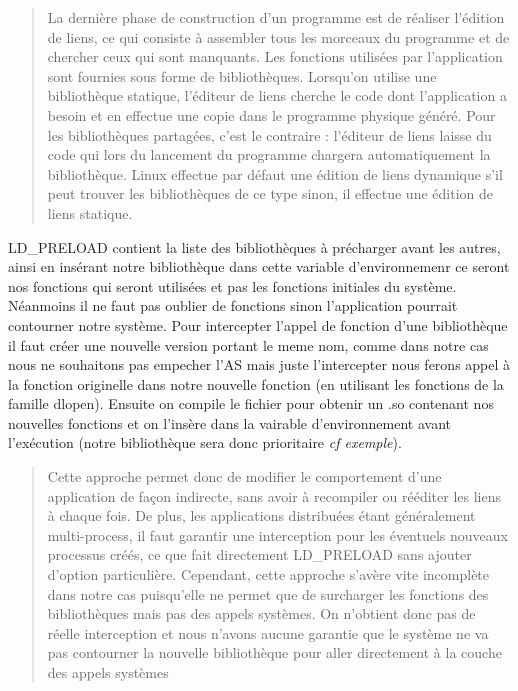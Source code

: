 \documentclass{article}
\begin{document}
\begin{quotation} 
{\color{green} La dernière phase de construction d’un programme est de
  réaliser l’édition de liens, ce qui consiste à assembler tous les
  morceaux du programme et de chercher ceux qui sont manquants.  Les
  fonctions utilisées par l’application sont fournies sous forme de
  bibliothèques. Lorsqu’on utilise une bibliothèque statique,
  l’éditeur de liens cherche le code dont l’application a besoin et en
  effectue une copie dans le programme physique généré. Pour les
  bibliothèques partagées, c’est le contraire : l’éditeur de liens
  laisse du code qui lors du lancement du programme chargera
  automatiquement la bibliothèque. Linux effectue par défaut une
  édition de liens dynamique s’il peut trouver les bibliothèques de ce
  type sinon, il effectue une édition de liens statique.  }
\end{quotation}

LD\_PRELOAD contient la liste des bibliothèques à précharger avant les
autres, ainsi en insérant notre bibliothèque dans cette variable
d'environnemenr ce seront nos fonctions qui seront utilisées et pas
les fonctions initiales du système. Néanmoins il ne faut pas oublier
de fonctions sinon l'application pourrait contourner notre
système. Pour intercepter l'appel de fonction d'une bibliothèque il
faut créer une nouvelle version portant le meme nom, comme dans notre
cas nous ne souhaitons pas empecher l'AS mais juste l'intercepter nous
ferons appel à la fonction originelle dans notre nouvelle fonction (en
utilisant les fonctions de la famille dlopen). Ensuite on compile le
fichier pour obtenir un .so contenant nos nouvelles fonctions et on
l'insère dans la vairable d'environnement avant l'exécution (notre
bibliothèque sera donc prioritaire \textit{cf exemple}).

\begin{quotation}
{\color{green} Cette approche permet donc de modifier le comportement
  d’une application de façon indirecte, sans avoir à recompiler ou
  rééditer les liens à chaque fois. De plus, les applications
  distribuées étant généralement multi-process, il faut garantir une
  interception pour les éventuels nouveaux processus créés, ce que
  fait directement LD\_PRELOAD sans ajouter d’option
  particulière. Cependant, cette approche s’avère vite incomplète dans
  notre cas puisqu’elle ne permet que de surcharger les fonctions des
  bibliothèques mais pas des appels systèmes. On n’obtient donc pas de
  réelle interception et nous n’avons aucune garantie que le système
  ne va pas contourner la nouvelle bibliothèque pour aller directement
  à la couche des appels systèmes}
\end{quotation}
\end{document}
